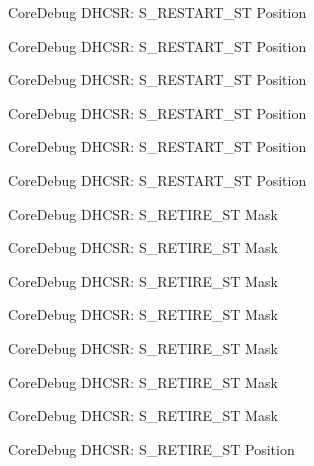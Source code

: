 \begin{DoxyRefList}
\label{deprecated__deprecated000107}%
%
Core\+Debug D\+H\+C\+SR\+: S\+\_\+\+R\+E\+S\+T\+A\+R\+T\+\_\+\+ST Position 

\label{deprecated__deprecated000161}%
%
Core\+Debug D\+H\+C\+SR\+: S\+\_\+\+R\+E\+S\+T\+A\+R\+T\+\_\+\+ST Position 

\label{deprecated__deprecated000246}%
%
Core\+Debug D\+H\+C\+SR\+: S\+\_\+\+R\+E\+S\+T\+A\+R\+T\+\_\+\+ST Position 

\label{deprecated__deprecated000303}%
%
Core\+Debug D\+H\+C\+SR\+: S\+\_\+\+R\+E\+S\+T\+A\+R\+T\+\_\+\+ST Position 

\label{deprecated__deprecated000379}%
%
Core\+Debug D\+H\+C\+SR\+: S\+\_\+\+R\+E\+S\+T\+A\+R\+T\+\_\+\+ST Position 

\label{deprecated__deprecated000458}%
%
Core\+Debug D\+H\+C\+SR\+: S\+\_\+\+R\+E\+S\+T\+A\+R\+T\+\_\+\+ST Position  
\item[Member \mbox{\hyperlink{group__CMSIS__CoreDebug_ga89dceb5325f6bcb36a0473d65fbfcfa6}{Core\+Debug\+\_\+\+D\+H\+C\+S\+R\+\_\+\+S\+\_\+\+R\+E\+T\+I\+R\+E\+\_\+\+S\+T\+\_\+\+Msk}} ]\label{deprecated__deprecated000012}%
%
Core\+Debug D\+H\+C\+SR\+: S\+\_\+\+R\+E\+T\+I\+R\+E\+\_\+\+ST Mask 

\label{deprecated__deprecated000112}%
%
Core\+Debug D\+H\+C\+SR\+: S\+\_\+\+R\+E\+T\+I\+R\+E\+\_\+\+ST Mask 

\label{deprecated__deprecated000166}%
%
Core\+Debug D\+H\+C\+SR\+: S\+\_\+\+R\+E\+T\+I\+R\+E\+\_\+\+ST Mask 

\label{deprecated__deprecated000251}%
%
Core\+Debug D\+H\+C\+SR\+: S\+\_\+\+R\+E\+T\+I\+R\+E\+\_\+\+ST Mask 

\label{deprecated__deprecated000308}%
%
Core\+Debug D\+H\+C\+SR\+: S\+\_\+\+R\+E\+T\+I\+R\+E\+\_\+\+ST Mask 

\label{deprecated__deprecated000384}%
%
Core\+Debug D\+H\+C\+SR\+: S\+\_\+\+R\+E\+T\+I\+R\+E\+\_\+\+ST Mask 

\label{deprecated__deprecated000463}%
%
Core\+Debug D\+H\+C\+SR\+: S\+\_\+\+R\+E\+T\+I\+R\+E\+\_\+\+ST Mask  
\item[Member \mbox{\hyperlink{group__CMSIS__CoreDebug_ga2328118f8b3574c871a53605eb17e730}{Core\+Debug\+\_\+\+D\+H\+C\+S\+R\+\_\+\+S\+\_\+\+R\+E\+T\+I\+R\+E\+\_\+\+S\+T\+\_\+\+Pos}} ]\label{deprecated__deprecated000011}%
%
Core\+Debug D\+H\+C\+SR\+: S\+\_\+\+R\+E\+T\+I\+R\+E\+\_\+\+ST Position 


\end{DoxyRefList}
